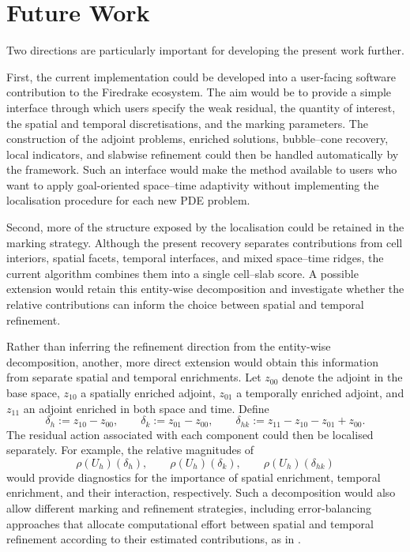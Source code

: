 \section{Future Work}
\label{sec:future}

Two directions are particularly important for developing the present work further.

First, the current implementation could be developed into a user-facing software contribution to the Firedrake ecosystem. The aim would be to provide a simple interface through which users specify the weak residual, the quantity of interest, the spatial and temporal discretisations, and the marking parameters. The construction of the adjoint problems, enriched solutions, bubble--cone recovery, local indicators, and slabwise refinement could then be handled automatically by the framework. Such an interface would make the method available to users who want to apply goal-oriented space--time adaptivity without implementing the localisation procedure for each new PDE problem.

Second, more of the structure exposed by the localisation could be retained in the marking strategy. Although the present recovery separates contributions from cell interiors, spatial facets, temporal interfaces, and mixed space--time ridges, the current algorithm combines them into a single cell--slab score. A possible extension would retain this entity-wise decomposition and investigate whether the relative contributions can inform the choice between spatial and temporal refinement.

Rather than inferring the refinement direction from the entity-wise decomposition, another, more direct extension would obtain this information from separate spatial and temporal enrichments.
Let \(z_{00}\) denote the adjoint in the base space, \(z_{10}\) a spatially enriched adjoint, \(z_{01}\) a temporally enriched adjoint, and \(z_{11}\) an adjoint enriched in both space and time. Define
\[
\delta_h:=z_{10}-z_{00},
\qquad
\delta_k:=z_{01}-z_{00},
\qquad
\delta_{hk}:=z_{11}-z_{10}-z_{01}+z_{00}.
\]
The residual action associated with each component could then be localised separately. For example, the relative magnitudes of
\[
\rho(U_h)(\delta_h),
\qquad
\rho(U_h)(\delta_k),
\qquad
\rho(U_h)(\delta_{hk})
\]would provide diagnostics for the importance of spatial enrichment, temporal enrichment, and their interaction, respectively. Such a decomposition would also allow different marking and refinement strategies, including error-balancing approaches that allocate computational effort between spatial and temporal refinement according to their estimated contributions, as in \cite{Bangerth_Rannacher_2003}.


